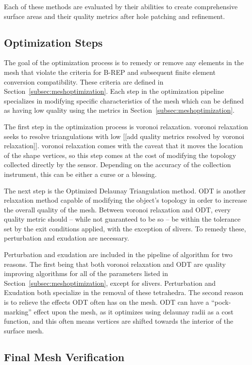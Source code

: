 \documentclass[12pt]{drexelthesis}
\let\Oldsubsection\subsection
\renewcommand{\subsection}{\FloatBarrier\Oldsubsection}
\begin{document}
Each of these methods are evaluated by their abilities to create comprehensive surface areas and their quality metrics after hole patching and refinement.

\subsection{Optimization Steps}

The goal of the optimization process is to remedy or remove any elements in the mesh that violate the criteria for B-REP and subsequent finite element conversion compatibility. These criteria are defined in Section~\ref{subsec:meshoptimization}. Each step in the optimization pipeline specializes in modifying specific characteristics of the mesh which can be defined as having low quality using the metrics in Section~\ref{subsec:meshoptimization}.

The first step in the optimization process is voronoi relaxation. voronoi relaxation seeks to resolve triangulations with low [[add quality metrics resolved by voronoi relaxation]]. voronoi relaxation comes with the caveat that it moves the location of the shape vertices, so this step comes at the cost of modifying the topology collected directly by the sensor. Depending on the accuracy of the collection instrument, this can be either a curse or a blessing.

The next step is the Optimized Delaunay Triangulation method. ODT is another relaxation method capable of modifying the object's topology in order to increase the overall quality of the mesh. Between voronoi relaxation and ODT, every quality metric should -- while not guaranteed to be so -- be within the tolerance set by the exit conditions applied, with the exception of slivers. To remedy these, perturbation and exudation are necessary.

Perturbation and exudation are included in the pipeline of algorithm for two reasons. The first being that both voronoi relaxation and ODT are quality improving algorithms for all of the parameters listed in Section~\ref{subsec:meshoptimization}, except for slivers. Perturbation and Exudation both specialize in the removal of these tetrahedra. The second reason is to relieve the effects ODT often has on the mesh. ODT can have a ``pock-marking'' effect upon the mesh, as it optimizes using delaunay radii as a cost function, and this often means vertices are shifted towards the interior of the surface mesh. 
 

\subsection{Final Mesh Verification}
\end{document}

